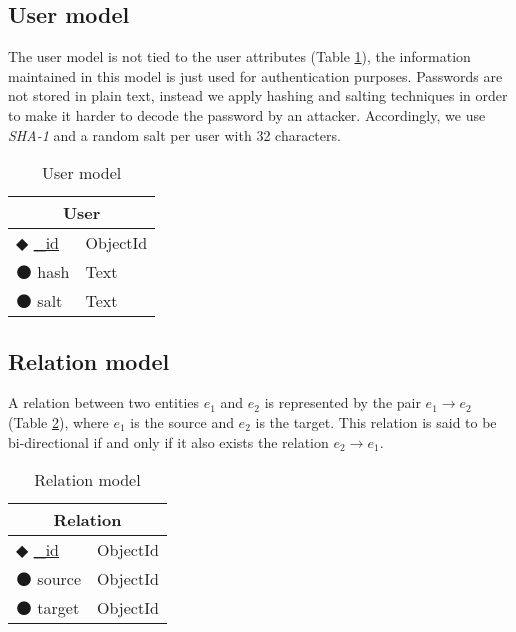 \subsection{User model}

The user model is not tied to the user attributes (Table \ref{table:user}), the information maintained in this model is just used for authentication purposes. Passwords are not stored in plain text, instead we apply hashing and salting techniques \cite{password} in order to make it harder to decode the password by an attacker. Accordingly, we use \emph{SHA-1} and a random salt per user with 32 characters.

\begin{table}[!htb]
\centering
\caption{User model}
\label{table:user}
    \begin{tabular}{|ll|}
        \hline
        \multicolumn{2}{|c|}{\textbf{User}}         \\ \hline
        $\Diamondblack$ \underline{\_id}  & ObjectId  \\ 
        $\medbullet$ hash           & Text          \\ 
        $\medbullet$ salt      & Text               \\ \hline
    \end{tabular}
\end{table}

\subsection{Relation model}

A relation between two entities $e_1$ and $e_2$ is represented by the pair $e_1\rightarrow e_2$ (Table \ref{table:relation}), where $e_1$ is the source and $e_2$ is the target. This relation is said to be bi-directional if and only if it also exists the relation $e_2\rightarrow e_1$.

\begin{table}[!htb]
\centering
\caption{Relation model}
\label{table:relation}
    \begin{tabular}{|ll|}
        \hline
        \multicolumn{2}{|c|}{\textbf{Relation}}     \\ \hline
        $\Diamondblack$ \underline{\_id}  & ObjectId  \\ 
        $\medbullet$ source           & ObjectId    \\ 
        $\medbullet$ target      & ObjectId         \\ \hline
    \end{tabular}
\end{table}

